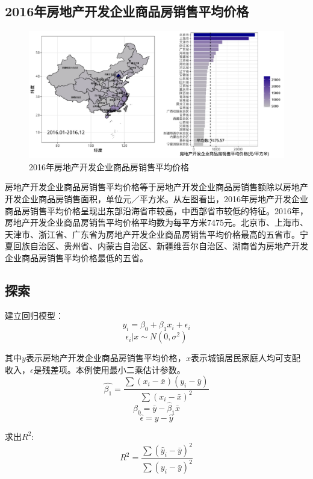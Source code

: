 \documentclass[11pt,a4paper,onecolumn]{article}
\begin{document}
\subsection{2016年房地产开发企业商品房销售平均价格}

\begin{figure}[H]
	\centering
	\includegraphics[width=400pt]{房地产开发企业商品房销售平均价格.pdf}
	\caption{2016年房地产开发企业商品房销售平均价格}
\end{figure}

房地产开发企业商品房销售平均价格等于房地产开发企业商品房销售额除以房地产开发企业商品房销售面积，单位元／平方米。从左图看出，2016年房地产开发企业商品房销售平均价格呈现出东部沿海省市较高，中西部省市较低的特征。2016年，房地产开发企业商品房销售平均价格平均数为每平方米7475元。北京市、上海市、天津市、浙江省、广东省为房地产开发企业商品房销售平均价格最高的五省市。宁夏回族自治区、贵州省、内蒙古自治区、新疆维吾尔自治区、湖南省为房地产开发企业商品房销售平均价格最低的五省。

\subsection{探索}

建立回归模型：
$$y_i = \beta_0 + \beta_1 x_i + \epsilon_i$$
$$\epsilon_i | x \sim N(0, \sigma^2)$$

其中$y$表示房地产开发企业商品房销售平均价格，$x$表示城镇居民家庭人均可支配收入，$\epsilon$是残差项。本例使用最小二乘估计参数。
$$\hat{\beta_1}=\frac{\sum(x_i-\bar{x})(y_i-\bar{y})}{\sum(x_i-\bar{x})^2}$$
$$\hat{\beta}_0=\bar{y}-\hat{\beta}_1\bar{x}$$
$$\hat{\epsilon}=y-\hat{y}$$

求出$R^2$:
$$R^2=\frac{\sum(\hat{y}_i-\bar{y})^2}{\sum(y_i-\bar{y})^2}$$
\end{document}
